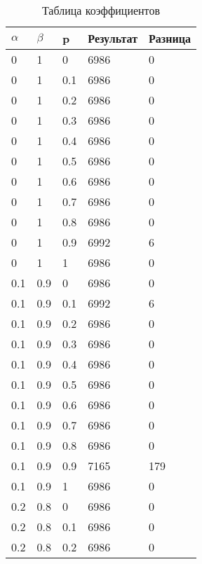 \begin{table}[ht]
	\centering
	\caption{Таблица коэффициентов}
	\label{table:ref1}
	\begin{tabular}{ | l | l | l | l | l |}
		\hline
		$\alpha$ & $\beta$ & p   & Результат & Разница \\
		\hline
		0        & 1       & 0   & 6986      & 0       \\
		0        & 1       & 0.1 & 6986      & 0       \\
		0        & 1       & 0.2 & 6986      & 0       \\
		0        & 1       & 0.3 & 6986      & 0       \\
		0        & 1       & 0.4 & 6986      & 0       \\
		0        & 1       & 0.5 & 6986      & 0       \\
		0        & 1       & 0.6 & 6986      & 0       \\
		0        & 1       & 0.7 & 6986      & 0       \\
		0        & 1       & 0.8 & 6986      & 0       \\
		0        & 1       & 0.9 & 6992      & 6       \\
		0        & 1       & 1   & 6986      & 0       \\
		0.1      & 0.9     & 0   & 6986      & 0       \\
		0.1      & 0.9     & 0.1 & 6992      & 6       \\
		0.1      & 0.9     & 0.2 & 6986      & 0       \\
		0.1      & 0.9     & 0.3 & 6986      & 0       \\
		0.1      & 0.9     & 0.4 & 6986      & 0       \\
		0.1      & 0.9     & 0.5 & 6986      & 0       \\
		0.1      & 0.9     & 0.6 & 6986      & 0       \\
		0.1      & 0.9     & 0.7 & 6986      & 0       \\
		0.1      & 0.9     & 0.8 & 6986      & 0       \\
		0.1      & 0.9     & 0.9 & 7165      & 179     \\
		0.1      & 0.9     & 1   & 6986      & 0       \\
		0.2      & 0.8     & 0   & 6986      & 0       \\
		0.2      & 0.8     & 0.1 & 6986      & 0       \\
		0.2      & 0.8     & 0.2 & 6986      & 0       \\

\end{tabular}
\end{table}
